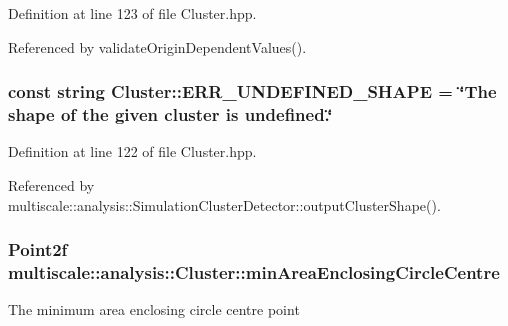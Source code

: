 Definition at line 123 of file Cluster.\-hpp.



Referenced by validate\-Origin\-Dependent\-Values().

\hypertarget{classmultiscale_1_1analysis_1_1Cluster_a546b8e93e3f1ef51a9932f8599639070}{
\subsubsection[{E\-R\-R\-\_\-\-U\-N\-D\-E\-F\-I\-N\-E\-D\-\_\-\-S\-H\-A\-P\-E}]{\setlength{\rightskip}{0pt plus 5cm}const string Cluster\-::\-E\-R\-R\-\_\-\-U\-N\-D\-E\-F\-I\-N\-E\-D\-\_\-\-S\-H\-A\-P\-E = \char`\"{}The {\bf shape} of the given cluster is undefined.\char`\"{}\hspace{0.3cm}{\ttfamily [static]}}}\label{classmultiscale_1_1analysis_1_1Cluster_a546b8e93e3f1ef51a9932f8599639070}


Definition at line 122 of file Cluster.\-hpp.



Referenced by multiscale\-::analysis\-::\-Simulation\-Cluster\-Detector\-::output\-Cluster\-Shape().

\hypertarget{classmultiscale_1_1analysis_1_1Cluster_a47e672060b4025dcd07ebb9c5fd99f0c}{
\subsubsection[{min\-Area\-Enclosing\-Circle\-Centre}]{\setlength{\rightskip}{0pt plus 5cm}Point2f multiscale\-::analysis\-::\-Cluster\-::min\-Area\-Enclosing\-Circle\-Centre\hspace{0.3cm}{\ttfamily [private]}}}\label{classmultiscale_1_1analysis_1_1Cluster_a47e672060b4025dcd07ebb9c5fd99f0c}
The minimum area enclosing circle centre point 

